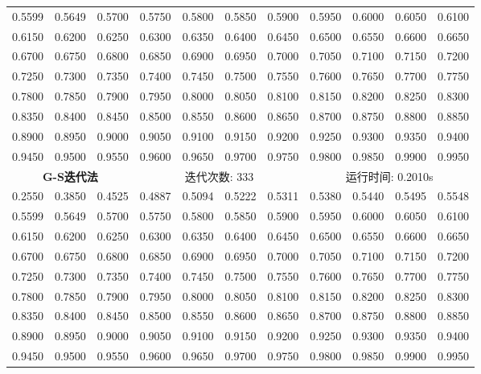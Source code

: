 \documentclass{article}
\begin{document}
\begin{table}[H]
\begin{tabular}{|*{11}{c}|}
		0.5599 & 0.5649 & 0.5700 & 0.5750 & 0.5800 & 0.5850 & 0.5900 & 0.5950 & 0.6000 & 0.6050 & 0.6100 \\
		0.6150 & 0.6200 & 0.6250 & 0.6300 & 0.6350 & 0.6400 & 0.6450 & 0.6500 & 0.6550 & 0.6600 & 0.6650 \\
		0.6700 & 0.6750 & 0.6800 & 0.6850 & 0.6900 & 0.6950 & 0.7000 & 0.7050 & 0.7100 & 0.7150 & 0.7200 \\
		0.7250 & 0.7300 & 0.7350 & 0.7400 & 0.7450 & 0.7500 & 0.7550 & 0.7600 & 0.7650 & 0.7700 & 0.7750 \\
		0.7800 & 0.7850 & 0.7900 & 0.7950 & 0.8000 & 0.8050 & 0.8100 & 0.8150 & 0.8200 & 0.8250 & 0.8300 \\
		0.8350 & 0.8400 & 0.8450 & 0.8500 & 0.8550 & 0.8600 & 0.8650 & 0.8700 & 0.8750 & 0.8800 & 0.8850 \\
		0.8900 & 0.8950 & 0.9000 & 0.9050 & 0.9100 & 0.9150 & 0.9200 & 0.9250 & 0.9300 & 0.9350 & 0.9400 \\
		0.9450 & 0.9500 & 0.9550 & 0.9600 & 0.9650 & 0.9700 & 0.9750 & 0.9800 & 0.9850 & 0.9900 & 0.9950 \\
		\hline
		\multicolumn{3}{|c}{\textbf{G-S迭代法}} & \multicolumn{4}{|c}{迭代次数: 333}\ & \multicolumn{4}{|c|}{运行时间: 0.2010s}\\
		\hline
		0.2550 & 0.3850 & 0.4525 & 0.4887 & 0.5094 & 0.5222 & 0.5311 & 0.5380 & 0.5440 & 0.5495 & 0.5548 \\
		0.5599 & 0.5649 & 0.5700 & 0.5750 & 0.5800 & 0.5850 & 0.5900 & 0.5950 & 0.6000 & 0.6050 & 0.6100 \\
		0.6150 & 0.6200 & 0.6250 & 0.6300 & 0.6350 & 0.6400 & 0.6450 & 0.6500 & 0.6550 & 0.6600 & 0.6650 \\
		0.6700 & 0.6750 & 0.6800 & 0.6850 & 0.6900 & 0.6950 & 0.7000 & 0.7050 & 0.7100 & 0.7150 & 0.7200 \\
		0.7250 & 0.7300 & 0.7350 & 0.7400 & 0.7450 & 0.7500 & 0.7550 & 0.7600 & 0.7650 & 0.7700 & 0.7750 \\
		0.7800 & 0.7850 & 0.7900 & 0.7950 & 0.8000 & 0.8050 & 0.8100 & 0.8150 & 0.8200 & 0.8250 & 0.8300 \\
		0.8350 & 0.8400 & 0.8450 & 0.8500 & 0.8550 & 0.8600 & 0.8650 & 0.8700 & 0.8750 & 0.8800 & 0.8850 \\
		0.8900 & 0.8950 & 0.9000 & 0.9050 & 0.9100 & 0.9150 & 0.9200 & 0.9250 & 0.9300 & 0.9350 & 0.9400 \\
		0.9450 & 0.9500 & 0.9550 & 0.9600 & 0.9650 & 0.9700 & 0.9750 & 0.9800 & 0.9850 & 0.9900 & 0.9950 \\
		\hline

\end{tabular}
\end{table}
\end{document}
